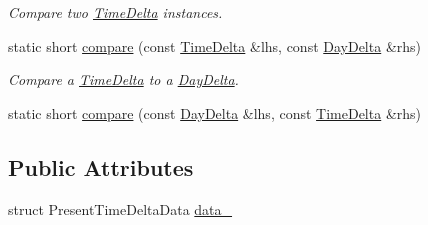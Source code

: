 \begin{DoxyCompactItemize}
\begin{DoxyCompactList}\small\item\em Compare two \hyperlink{structTimeDelta}{Time\-Delta} instances. \end{DoxyCompactList}\item 
static short \hyperlink{structTimeDelta_ae009ca59e3e2a756cc2751c1f6261482}{compare} (const \hyperlink{structTimeDelta}{Time\-Delta} \&lhs, const \hyperlink{structDayDelta}{Day\-Delta} \&rhs)
\begin{DoxyCompactList}\small\item\em Compare a \hyperlink{structTimeDelta}{Time\-Delta} to a \hyperlink{structDayDelta}{Day\-Delta}. \end{DoxyCompactList}\item 
static short \hyperlink{structTimeDelta_a946f3f7963ce94f73f440c7b8aaec9dd}{compare} (const \hyperlink{structDayDelta}{Day\-Delta} \&lhs, const \hyperlink{structTimeDelta}{Time\-Delta} \&rhs)
\end{DoxyCompactItemize}
\subsection*{Public Attributes}
\begin{DoxyCompactItemize}
\item 
struct Present\-Time\-Delta\-Data \hyperlink{structTimeDelta_ab88989772d6ab486e1e008238d96eb81}{data\-\_\-}
\end{DoxyCompactItemize}
